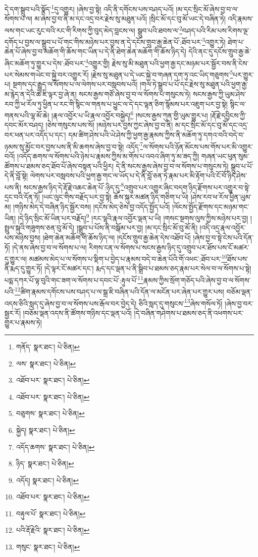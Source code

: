 དེ་དག་སྒྲུབ་པའི་སྣོད་\footnote{གནོད་  སྣར་ཐང་།  པེ་ཅིན། }དུ་འགྱུར། །ཞེས་བྱ་སྟེ། འདི་ནི་དགོངས་པས་བཤད་པའོ། །མ་དང་སྲིང་མོ་ཞེས་བྱ་བ་ལ་སོགས་པ་ལ། མ་ཞེས་བྱ་བ་ནི་མ་དང་འདྲ་བར་རྗེས་སུ་མཐུན་པའོ། །སྲིང་མོ་དང་བུ་མོ་ཡང་དེ་བཞིན་ཏེ། འདི་རྣམས་ལས་གང་ཡང་རུང་བའི་རང་གི་རིགས་ཀྱི་བུད་མེད་བླངས་ལ། སྒྲུབ་པའི་ཐབས་ལ་\footnote{ལས་  སྣར་ཐང་།  པེ་ཅིན། }བཤད་པའི་རིམ་པས་རིགས་ལྔ་དགོད་པ་བྱས་ལ་སྒྲུབ་པ་པོ་གང་གིས་མཉེས་པར་བྱས་ན་དེ་དངོས་གྲུབ་རྒྱ་ཆེན་པོ་:ཐོབ་པར་\footnote{འཐོབ་པར་  སྣར་ཐང་།  པེ་ཅིན། }འགྱུར་ཏེ། ཐེག་པ་ཆེན་པོ་ཞེས་བྱ་བ་མཆོག་གི་ཆོས་གང་ཡིན་པ་དེ་ནི་ཐེག་ཆེན་མཆོག་གི་ཆོས་ཉིད་དེ། དེའི་ནང་དུ་དངོས་གྲུབ་རྒྱ་ཆེ་ཞིང་མཆོག་ཏུ་གྱུར་པ་དེས་:ཐོབ་པར་\footnote{འཐོབ་པར་  སྣར་ཐང་།  པེ་ཅིན། }འགྱུར་གྱི། རྗེས་སུ་མི་མཐུན་པའི་ཕྱག་རྒྱ་དང་མཉམ་པར་སྦྱོར་བས་ནི་ངེས་པར་སེམས་གཡེང་བ་སྐྱེ་བར་འགྱུར་རོ། །རྗེས་སུ་མཐུན་པ་དེ་ཡང་སྐྱེ་བ་གཞན་དག་ཏུ་འང་ཡིད་གཅུགས་\footnote{བཅུགས་  སྣར་ཐང་།  པེ་ཅིན། }པར་གྱུར་པ། སྔགས་དང་རྒྱུད་ལ་སོགས་པ་ལ་ལེགས་པར་བསླབས་པའོ། །གལ་ཏེ་སྒྲུབ་པ་པོ་དང་རྗེས་སུ་མཐུན་པའི་ཕྱག་རྒྱ་མ་རྙེད་ན་དེའི་ཚེ་ཇི་ལྟར་བྱ་ཞེ་ན། སངས་རྒྱས་གཙོ་ཞེས་བྱ་བ་ལ་སོགས་པ་གསུངས་ཏེ། སངས་རྒྱས་ཀྱི་ཡུམ་ཤེས་རབ་ཀྱི་ཕ་རོལ་ཏུ་ཕྱིན་པ་རང་གི་སྙིང་ལ་གནས་པ་ཕྱུང་ལ་དེ་དང་ལྷན་ཅིག་སྙོམས་པར་འཇུག་པར་བྱ་སྟེ། སྙིང་ལ་གནས་པའི་ལྷ་མོ་ཆེ། །རྣལ་འབྱོར་པ་ཡི་རྣལ་འབྱོར་བསྐྱེད།\footnote{སྐྱེད།  སྣར་ཐང་།  པེ་ཅིན། } །སངས་རྒྱས་ཀུན་གྱི་ཡུམ་གྱུར་པ། །རྡོ་རྗེ་དབྱིངས་ཀྱི་དབང་མོར་བཤད། །ཅེས་གསུངས་པས་སོ། །མཉེས་པར་བྱས་ཀྱང་ཞེས་བྱ་བ་ནི། མ་དང་སྲིང་མོ་དང་བུ་མོ་དང་འདྲ་བར་ཕན་པར་འདོད་པ་དང་། དམ་ཚིག་ཤེས་པའི་ཡེ་ཤེས་ཀྱི་ཕྱག་རྒྱ་རྣམས་ཀྱིས་ནི་མཆོག་ཏུ་དགའ་བའི་བདེ་བ་ཉམས་སུ་མྱོང་བར་བྱས་པས་ནི་མི་ཆགས་ཞེས་བྱ་བ་སྟེ། འདོད་\footnote{འདོད་ཆགས་  སྣར་ཐང་།  པེ་ཅིན། }ལ་སོགས་པའི་ཉོན་མོངས་པས་གོས་པར་མི་འགྱུར་བའོ། །འདོད་ཆགས་ལ་སོགས་པའི་ཉེས་པ་རྣམས་ཀྱིས་མ་གོས་པ་འབའ་ཞིག་ཏུ་མ་ཟད་ཀྱི། གཞན་ཡང་ཕུན་སུམ་ཚོགས་པ་ཐམས་ཅད་ཐོབ་པོ་ཞེས་བསྟན་པའི་ཕྱིར། དེ་ནི་སངས་རྒྱས་ཞེས་བྱ་བ་ལ་སོགས་པ་གསུངས་ཏེ། སྒྲུབ་པ་པོ་དེ་ནི་བློ་སྟེ། ལེགས་པར་བསླབས་པའི་ཕྱག་རྒྱ་གང་ལ་ཡོད་པ་དེ་ནི་བློ་ཅན་ཏེ་རྣམ་པར་མི་རྟོག་པའི་ངོ་བོ་ཉིད་ཤེས་པས་ནི། སངས་རྒྱས་ཉིད་དེ་རྡོ་རྗེ་འཆང་ཆེན་པོ་:ཉིད་དུ་\footnote{ཉིད་  སྣར་ཐང་།  པེ་ཅིན། }འགྲུབ་པར་འགྱུར་ཞིང་བདག་ཉིད་རྫོགས་པར་འགྱུར་བ་སྟེ་དྲང་བའི་དོན་ཏོ། །ཡང་ལུང་གིས་བརྗོད་པར་བྱ་སྟེ། ཆོས་སྐུར་མཚན་ཉིད་གཅིག་པ་ཡི། །ཤེས་རབ་ཕ་རོལ་ཕྱིན་ཡུམ་མ། །གཉིས་མེད་དེ་བཞིན་ཉིད་སྦྱོར་བས། །དངོས་མེད་ཅེས་བྱ་འདོད་སྤྱོད་པའོ། །ལོངས་སྤྱོད་རྫོགས་དང་མཉམ་གང་ཡིན། །དེ་ཉིད་སྲིང་མོ་ཡིན་པར་བརྗོད།\footnote{འདོད།  སྣར་ཐང་།  པེ་ཅིན། } །རང་ལྷའི་རྣལ་འབྱོར་ལྡན་པ་ཡི། །གསང་སྔགས་ལུས་ཀྱིས་མཉེས་པར་བྱ། །སྤྲུལ་སྐུའི་གཟུགས་ཅན་བུ་མོ་དེ། །སྒྲུབ་པ་པོས་ནི་བསྒོམ་པར་བྱ། །མ་དང་སྲིང་མོ་བུ་མོ་ནི། །འདི་འདྲ་རྣལ་འབྱོར་པས་མཉེས་བྱས། །ཐེག་ཆེན་མཆོག་གི་ཆོས་ཉིད་ལ། །དངོས་གྲུབ་རྒྱ་ཆེན་དེས་འཐོབ་པོ། །ཞེས་བྱ་བ་སྟེ་ངེས་པའི་དོན་ཏོ། །དེ་ནས་ཞེས་བྱ་བ་ལ་སོགས་པ་ལ། རིགས་ངན་ལ་སོགས་པ་སངས་རྒྱས་ཉིད་དུ་འགྲུབ་པར་ཐོས་པས་ངོ་མཚར་དུ་གྱུར་ལ། མཚམས་མེད་པ་ལ་སོགས་པ་སྡིག་པ་བྱེད་པ་རྣམས་བདེ་བ་ཆེན་པོའི་གོ་འཕང་:ཐོབ་པར་\footnote{འཐོབ་པར་  སྣར་ཐང་།  པེ་ཅིན། }ཐོས་པས་ནི་རྨད་དུ་གྱུར་ཏོ། །དེ་ལྟར་ངོ་མཚར་དང་། རྨད་དང་ལྡན་པ་ནི་སྒྲིབ་པ་ཐམས་ཅད་རྣམ་པར་སེལ་བ་ལ་སོགས་པ་སྟེ། པདྨ་དཀར་པོ་ལྟ་བུའི་གང་ཟག་ལ་སོགས་པ་དབང་པོ་:རྟུལ་པོ་\footnote{བརྟུལ་པོ་  སྣར་ཐང་།  པེ་ཅིན། }རྣམས་ཀྱིས་སྲོག་གཅོད་པའི་ཞེས་བྱ་བ་ལ་སོགས་པའི་\footnote{པའི་རྡོ་རྗེའི་  སྣར་ཐང་།  པེ་ཅིན། }ཚིག་རྣམས་དགོངས་པས་བཤད་པ་ལ་སྒྲ་ཇི་བཞིན་པའི་དོན་ལ་མངོན་པར་ཞེན་པར་གྱུར་པས། བཅོམ་ལྡན་འདས་ཅིའི་སླད་དུ་ཞེས་བྱ་བ་ལ་སོགས་པས་རྒོལ་བར་བྱེད་དེ། ཅིའི་སླད་དུ་གསུངས་\footnote{གསུང་  སྣར་ཐང་།  པེ་ཅིན། }ཞེས་གསོལ་ཏོ། །ཞེས་བྱ་བར་སྦྱར་རོ། །བཅོམ་ལྡན་འདས་ནི་ཚོགས་གཉིས་དང་ལྡན་པའོ། །དེ་བཞིན་གཤེགས་པ་ཐམས་ཅད་ནི་འཕགས་པར་གྱུར་པ་རྣམས་ཏེ། 